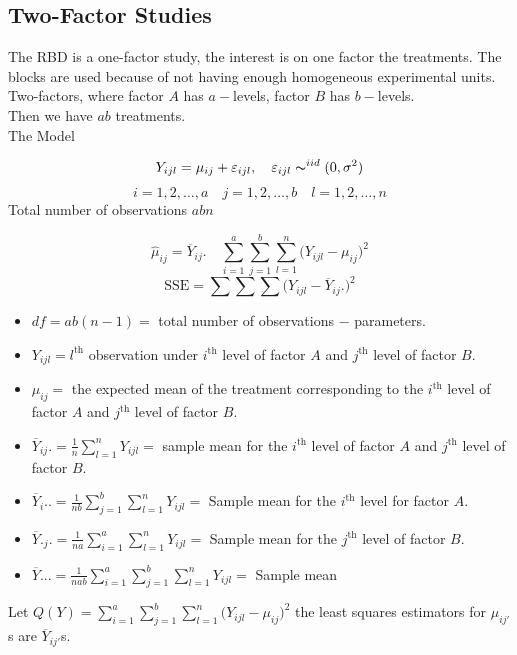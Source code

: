 \documentclass[11pt,a4paper]{article}
\theoremstyle{definition}
\begin{document}
\subsection{Two-Factor Studies}
The RBD is a one-factor study, the interest is on one factor the treatments. The blocks are used because  of not having enough homogeneous experimental units.\\
Two-factors, where factor $A$ has $a-$levels, factor $B$ has $b-$levels.\\

Then we have $ab$ treatments.\\

The Model 

$$Y_{ijl}=\mu_{ij}+\varepsilon_{ijl},\quad  \varepsilon_{ijl}\thicksim^{iid}(0,\sigma^2)$$
$$i=1,2,\ldots ,a\quad  j=1,2,\ldots ,b\quad  l=1,2,\ldots ,n$$
Total number of observations $abn$

$$\widehat{\mu}_{ij}=\overline{Y}_{ij}.\quad  \sum^a_{i=1}\sum^b_{j=1}\sum^n_{l=1}\big(Y_{ijl}-\mu_{ij}\big)^2$$
$$\text{SSE} = \sum \sum \sum \big(Y_{ijl}-\overline{Y}_{ij}.\big)^2$$

\begin{itemize}
\item[] $df=ab(n-1)=$ total number of observations $-$ parameters.
\item[] $Y_{ijl}= l^{\text{th}}$ observation under $i^{\text{th}}$ level of factor $A$ and $j^{\text{th}}$ level of factor $B$.
\item[] $\mu_{ij}=$ the expected mean of the treatment corresponding to the $i^{\text{th}}$ level of factor $A$ and $j^{\text{th}}$ level of factor $B$.
\item[] $\overline{Y}_{ij}.=\frac{1}{n}\sum\limits^n_{l=1}Y_{ijl}=$ sample mean for the $i^{\text{th}}$ level of factor $A$ and $j^{\text{th}}$ level of factor $B$.
\item[] $\overline{Y}_i..=\frac{1}{nb}\sum\limits^b_{j=1}\sum\limits^n_{l=1}Y_{ijl}=$ Sample mean for the $i^{\text{th}}$ level for factor $A$.
\item[] $\overline{Y}._j.=\frac{1}{na}\sum\limits^a_{i=1}\sum\limits^n_{l=1}Y_{ijl}= $ Sample mean for the $j^{\text{th}}$ level of factor $B$.
\item[]$\overline{Y}...=\frac{1}{nab}\sum\limits^a_{i=1}\sum\limits^b_{j=1}\sum\limits^n_{l=1}Y_{ijl}=$ Sample mean\\
\end{itemize}


Let $\displaystyle{Q(Y)=\sum^a_{i=1}\sum^b_{j=1}\sum^n_{l=1}\big(Y_{ijl}-\mu_{ij}\big)^2}$ the least squares estimators for $\mu_{ij'}$s are $\overline{Y}_{ij'}$s.
\end{document}
